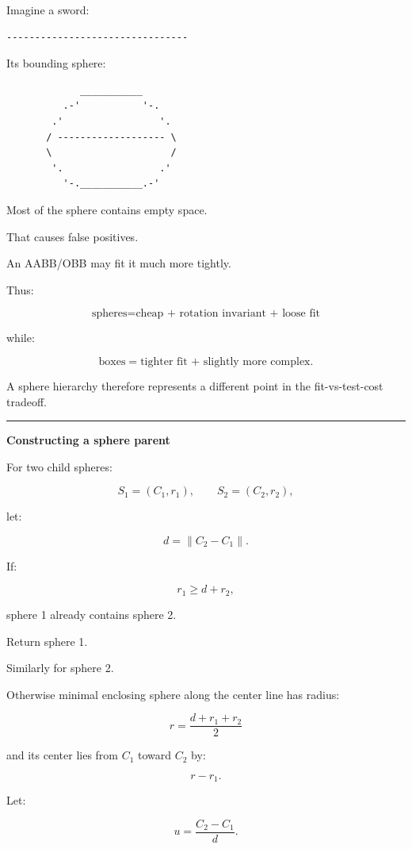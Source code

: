 Imagine a sword:

\begin{verbatim}
--------------------------------
\end{verbatim}

Its bounding sphere:

\begin{verbatim}
             ___________
          .-'           '-.
        .'                 '.
       / ------------------- \
       \                     /
        '.                 .'
          '-.___________.-'
\end{verbatim}

Most of the sphere contains empty space.

That causes false positives.

An AABB/OBB may fit it much more tightly.

Thus:

\[
\text{spheres}
=
\text{cheap + rotation invariant + loose fit}
\]

while:

\[
\text{boxes}
=
\text{tighter fit + slightly more complex}.
\]

A sphere hierarchy therefore represents a different point in the fit-vs-test-cost tradeoff.

\begin{center}\rule{0.5\linewidth}{0.5pt}\end{center}

\textbf{Constructing a sphere parent}

For two child spheres:

\[
S_1=(C_1,r_1),
\qquad
S_2=(C_2,r_2),
\]

let:

\[
d=\|C_2-C_1\|.
\]

If:

\[
r_1\ge d+r_2,
\]

sphere 1 already contains sphere 2.

Return sphere 1.

Similarly for sphere 2.

Otherwise minimal enclosing sphere along the center line has radius:

\[
\boxed{
r=
\frac{d+r_1+r_2}{2}
}
\]

and its center lies from \(C_1\) toward \(C_2\) by:

\[
r-r_1.
\]

Let:

\[
u=
\frac{C_2-C_1}{d}.
\]

